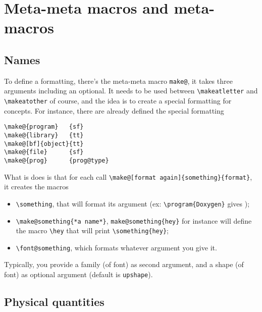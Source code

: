 \documentclass{documentation}
\begin{document}
\section[sec_2]{Meta-meta macros and meta-macros}

\subsection{Names}

To define a formatting, there's the meta-meta macro \verb!make@!, it takes
three arguments including an optional. It needs to be used between
\verb!\makeatletter! and \verb!\makeatother! of course, and the
idea is to create a special formatting for concepts. For instance,
there are already defined the special formatting
\begin{verbatim}
\make@{program}   {sf}
\make@{library}   {tt}
\make@[bf]{object}{tt}
\make@{file}      {sf}
\make@{prog}      {prog@type}
\end{verbatim}

What is does is that for each call \verb!\make@[format again]{something}{format}!, it creates
the macros
\begin{itemize}
\item \verb!\something!, that will format its argument 
        (ex: \verb!\program{Doxygen}! gives );
\item \verb!\make@something{*a name*}!, \verb!make@something{hey}!
        for instance will define the macro \verb!\hey! that
        will print \verb!\something{hey}!;
\item \verb!\font@something!, which formats whatever argument you give it.
\end{itemize}
Typically, you provide a family (of font) as second argument, and a shape (of font)
as optional argument (default is \verb!upshape!).

\subsection{Physical quantities}
\end{document}
